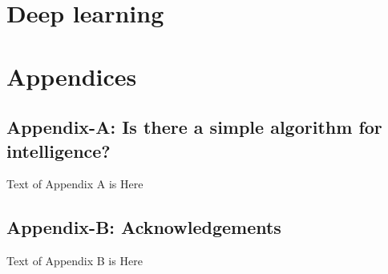 \documentclass[a4paper,12pt]{report}%
\begin{document}
\chapter{\color{IAF} \bf Deep learning}



\newpage

\chapter{\color{IAF} \bf Appendices}
\section{\color{IAF} Appendix-A: Is there a simple algorithm for intelligence?} \label{App:Appendix A}

Text of Appendix A is Here

\section{\color{IAF} Appendix-B: Acknowledgements} \label{App: Appendix B}

Text of Appendix B is Here

\end{document}
